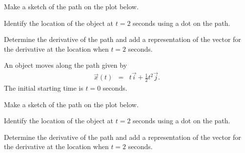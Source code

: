 \begin{problem}
  \begin{subproblem}
  \item Make a sketch of the path on the plot below.

    \scalebox{0.7}{}

  \item Identify the location of the object at $t=2$ seconds using a
    dot on the path.
  \item Determine the derivative of the path and add a representation
    of the vector for the derivative at the location when $t=2$
    seconds.  
    \vspace{5em}
  \end{subproblem}

  \clearpage

\item An object moves along the path given by
  \begin{eqnarray*}
    \vec{x}(t) & = & t \vec{i} + \frac{1}{2} t^2 \vec{j}.
  \end{eqnarray*}
  The initial starting time is $t=0$ seconds.

  \begin{subproblem}
  \item Make a sketch of the path on the plot below.

    \scalebox{0.7}{}

  \item Identify the location of the object at $t=2$ seconds using a
    dot on the path.
  \item Determine the derivative of the path and add a representation
    of the vector for the derivative at the location when $t=2$
    seconds.  
    \vspace{5em}
  \end{subproblem}

\end{problem}

\postClass

